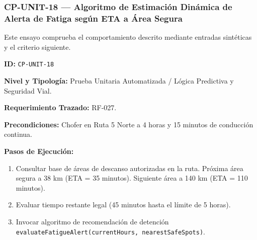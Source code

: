 \subsubsection*{CP-UNIT-18 — Algoritmo de Estimación Dinámica de Alerta de Fatiga según ETA a Área Segura}\label{sec:9-cp-unit-18}
Este ensayo comprueba el comportamiento descrito mediante entradas sintéticas y el criterio siguiente.

\par\noindent\textbf{ID:} \texttt{C\allowbreak{}P\allowbreak{}-\allowbreak{}U\allowbreak{}N\allowbreak{}I\allowbreak{}T\allowbreak{}-\allowbreak{}1\allowbreak{}8\allowbreak{}}\par
\par\noindent\textbf{Nivel y Tipología:} Prueba Unitaria Automatizada / Lógica Predictiva y Seguridad Vial.\par
\par\noindent\textbf{Requerimiento Trazado:} RF-027.\par
\par\noindent\textbf{Precondiciones:} Chofer en Ruta 5 Norte a 4 horas y 15 minutos de conducción continua.\par
\par\noindent\textbf{Pasos de Ejecución:} \par
\begin{enumerate}
\item Consultar base de áreas de descanso autorizadas en la ruta. Próxima área segura a 38 km (ETA = 35 minutos). Siguiente área a 140 km (ETA = 110 minutos).
\item Evaluar tiempo restante legal (45 minutos hasta el límite de 5 horas).
\item Invocar algoritmo de recomendación de detención \texttt{e\allowbreak{}v\allowbreak{}a\allowbreak{}l\allowbreak{}u\allowbreak{}a\allowbreak{}t\allowbreak{}e\allowbreak{}F\allowbreak{}a\allowbreak{}t\allowbreak{}i\allowbreak{}g\allowbreak{}u\allowbreak{}e\allowbreak{}A\allowbreak{}l\allowbreak{}e\allowbreak{}r\allowbreak{}t\allowbreak{}(\allowbreak{}c\allowbreak{}u\allowbreak{}r\allowbreak{}r\allowbreak{}e\allowbreak{}n\allowbreak{}t\allowbreak{}H\allowbreak{}o\allowbreak{}u\allowbreak{}r\allowbreak{}s\allowbreak{},\allowbreak{} n\allowbreak{}e\allowbreak{}a\allowbreak{}r\allowbreak{}e\allowbreak{}s\allowbreak{}t\allowbreak{}S\allowbreak{}a\allowbreak{}f\allowbreak{}e\allowbreak{}S\allowbreak{}p\allowbreak{}o\allowbreak{}t\allowbreak{}s\allowbreak{})\allowbreak{}}.
\end{enumerate}
